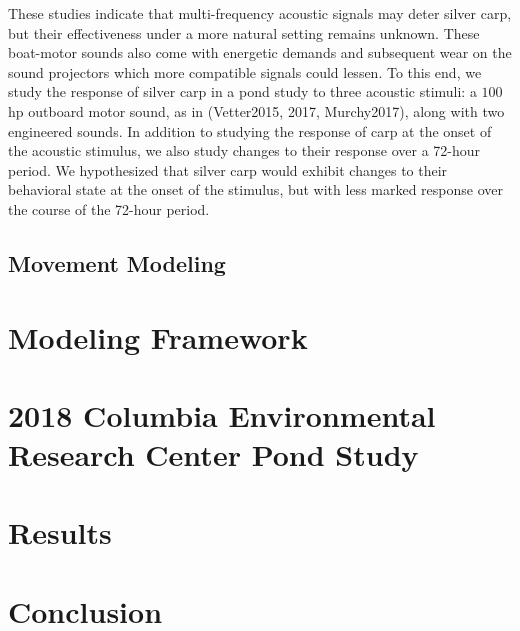 \documentclass[12pt]{article}
\begin{document}
These studies indicate that multi-frequency acoustic signals may deter silver carp, but their effectiveness under a more natural setting remains unknown. These boat-motor sounds also come with energetic demands and subsequent wear on the sound projectors which more compatible signals could lessen. To this end, we study the response of silver carp in a pond study to three acoustic stimuli: a $100$hp outboard motor sound, as in (Vetter2015, 2017, Murchy2017), along with two engineered sounds. In addition to studying the response of carp at the onset of the acoustic stimulus, we also study changes to their response over a 72-hour period. We hypothesized that silver carp would exhibit changes to their behavioral state at the onset of the stimulus, but with less marked response over the course of the 72-hour period.

\subsection{Movement Modeling}

\section{Modeling Framework}

\section{2018 Columbia Environmental Research Center Pond Study}

\section{Results}

\section{Conclusion}



\end{document}
